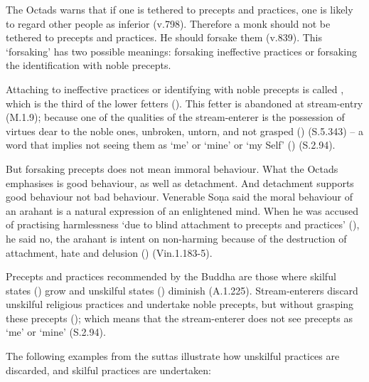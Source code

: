 
The Octads warns that if one is tethered to precepts and practices, one is likely to regard other people as inferior (v.798). Therefore a monk should not be tethered to precepts and practices. He should forsake them (v.839). This `forsaking' has two possible meanings: forsaking ineffective practices or forsaking the identification with noble precepts.

Attaching to ineffective practices or identifying with noble precepts is called , which is the third of the lower fetters (). This fetter is abandoned at stream-entry (M.1.9); because one of the qualities of the stream-enterer is the possession of virtues dear to the noble ones, unbroken, untorn, and not grasped () (S.5.343) -- a word that implies not seeing them as `me' or `mine' or `my Self' () (S.2.94).

But forsaking precepts does not mean immoral behaviour. What the Octads emphasises is good behaviour, as well as detachment. And detachment supports good behaviour not bad behaviour. Venerable Soṇa said the moral behaviour of an arahant is a natural expression of an enlightened mind. When he was accused of practising harmlessness `due to blind attachment to precepts and practices' (), he said no, the arahant is intent on non-harming because of the destruction of attachment, hate and delusion () (Vin.1.183-5).

Precepts and practices recommended by the Buddha are those where skilful states () grow and unskilful states () diminish (A.1.225). Stream-enterers discard unskilful religious practices and undertake noble precepts, but without grasping these precepts (); which means that the stream-enterer does not see precepts as `me' or `mine' (S.2.94).

The following examples from the suttas illustrate how unskilful practices are discarded, and skilful practices are undertaken:

